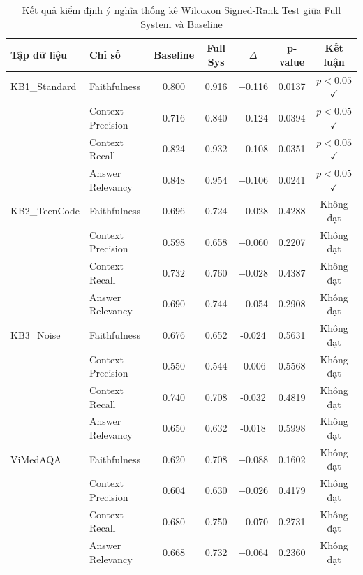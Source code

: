 \begin{table}[H]
\centering
\caption{Kết quả kiểm định ý nghĩa thống kê Wilcoxon Signed-Rank Test giữa Full System và Baseline}
\label{tab:significance_test}
\renewcommand{\arraystretch}{1.4}
\begin{tabular}{|l|l|c|c|c|c|c|}
\hline
\textbf{Tập dữ liệu} & \textbf{Chỉ số} & \textbf{Baseline} & \textbf{Full Sys} & \textbf{$\Delta$} & \textbf{p-value} & \textbf{Kết luận} \\ \hline
KB1_Standard & Faithfulness & 0.800 & 0.916 & +0.116 & 0.0137 & $p < 0.05$ $\checkmark$ \\
 & Context Precision & 0.716 & 0.840 & +0.124 & 0.0394 & $p < 0.05$ $\checkmark$ \\
 & Context Recall & 0.824 & 0.932 & +0.108 & 0.0351 & $p < 0.05$ $\checkmark$ \\
 & Answer Relevancy & 0.848 & 0.954 & +0.106 & 0.0241 & $p < 0.05$ $\checkmark$ \\
\hline
KB2_TeenCode & Faithfulness & 0.696 & 0.724 & +0.028 & 0.4288 & Không đạt \\
 & Context Precision & 0.598 & 0.658 & +0.060 & 0.2207 & Không đạt \\
 & Context Recall & 0.732 & 0.760 & +0.028 & 0.4387 & Không đạt \\
 & Answer Relevancy & 0.690 & 0.744 & +0.054 & 0.2908 & Không đạt \\
\hline
KB3_Noise & Faithfulness & 0.676 & 0.652 & -0.024 & 0.5631 & Không đạt \\
 & Context Precision & 0.550 & 0.544 & -0.006 & 0.5568 & Không đạt \\
 & Context Recall & 0.740 & 0.708 & -0.032 & 0.4819 & Không đạt \\
 & Answer Relevancy & 0.650 & 0.632 & -0.018 & 0.5998 & Không đạt \\
\hline
ViMedAQA & Faithfulness & 0.620 & 0.708 & +0.088 & 0.1602 & Không đạt \\
 & Context Precision & 0.604 & 0.630 & +0.026 & 0.4179 & Không đạt \\
 & Context Recall & 0.680 & 0.750 & +0.070 & 0.2731 & Không đạt \\
 & Answer Relevancy & 0.668 & 0.732 & +0.064 & 0.2360 & Không đạt \\
\hline
\end{tabular}
\end{table}